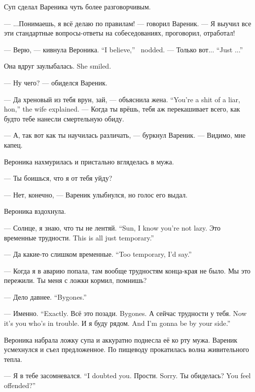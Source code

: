 Суп сделал Вареника чуть более разговорчивым.

--- ...Понимаешь, я всё делаю по правилам! --- говорил Вареник.
--- Я выучил все эти стандартные вопросы-ответы на собеседованиях, проговорил, отработал!

{--- Верю, --- кивнула Вероника.}
{``I believe,'' \Veronika\ nodded.}
{--- Только вот...}
{``Just ...''}

{Она вдруг заулыбалась.}
{She smiled.}

--- Ну чего? --- обиделся Вареник.

{--- Да хреновый из тебя врун, зай, --- объяснила жена.}
{``You're a shit of a liar, hon,'' the wife explained.}
--- Когда ты врёшь, тебя аж перекашивает всего, как будто тебе нанесли смертельную обиду.

--- А, так вот как ты научилась различать, --- буркнул Вареник.
--- Видимо, мне капец.

Вероника нахмурилась и пристально вгляделась в мужа.

--- Ты боишься, что я от тебя уйду?

--- Нет, конечно, --- Вареник улыбнулся, но голос его выдал.

Вероника вздохнула.

{--- Солнце, я знаю, что ты не лентяй.}
{``Sun, I know you're not lazy.}
{Это временные трудности.}
{This is all just temporary.''}

{--- Да какие-то слишком временные.}
{``Too temporary, I'd say.''}

--- Когда я в аварию попала, там вообще трудностям конца-края не было.
Мы это пережили.
Ты меня с ложки кормил, помнишь?

{--- Дело давнее.}
{``Bygones.''}

{--- Именно.}
{``Exactly.}
{Всё это позади.}
{Bygones.}
{А сейчас трудности у тебя.}
{Now it's you who's in trouble.}
{И я буду рядом.}
{And I'm gonna be by your side.''}

Вероника набрала ложку супа и аккуратно поднесла её ко рту мужа.
Вареник усмехнулся и съел предложенное.
По пищеводу прокатилась волна живительного тепла.

{--- Я в тебе засомневался.}
{``I doubted you.}
{Прости.}
{Sorry.}
{Ты обиделась?}
{You feel offended?''}


